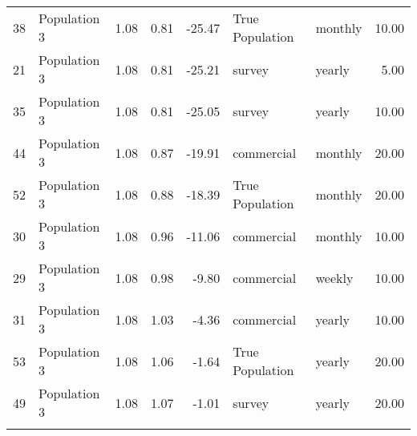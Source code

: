 \begin{longtable}{rlrrrllr}
   38 & Population 3 & 1.08 & 0.81 & -25.47 & True Population & monthly & 10.00 \\ 
   21 & Population 3 & 1.08 & 0.81 & -25.21 & survey & yearly & 5.00 \\ 
   35 & Population 3 & 1.08 & 0.81 & -25.05 & survey & yearly & 10.00 \\ 
   44 & Population 3 & 1.08 & 0.87 & -19.91 & commercial & monthly & 20.00 \\ 
   52 & Population 3 & 1.08 & 0.88 & -18.39 & True Population & monthly & 20.00 \\ 
   30 & Population 3 & 1.08 & 0.96 & -11.06 & commercial & monthly & 10.00 \\ 
   29 & Population 3 & 1.08 & 0.98 & -9.80 & commercial & weekly & 10.00 \\ 
   31 & Population 3 & 1.08 & 1.03 & -4.36 & commercial & yearly & 10.00 \\ 
   53 & Population 3 & 1.08 & 1.06 & -1.64 & True Population & yearly & 20.00 \\ 
   49 & Population 3 & 1.08 & 1.07 & -1.01 & survey & yearly & 20.00 \\ 
   \hline
\hline
\label{tab:6}
\end{longtable}
